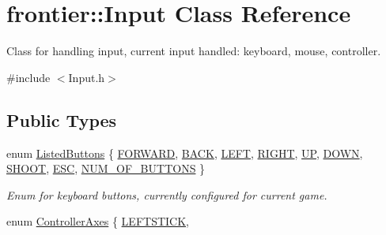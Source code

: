 \hypertarget{classfrontier_1_1_input}{}\section{frontier\+:\+:Input Class Reference}
\label{classfrontier_1_1_input}


Class for handling input, current input handled\+: keyboard, mouse, controller.  




{\ttfamily \#include $<$Input.\+h$>$}

\subsection*{Public Types}
\begin{DoxyCompactItemize}
\item 
enum \hyperlink{classfrontier_1_1_input_ada5b6b09af9c827bacee6fbc69015096}{Listed\+Buttons} \{ \newline
\hyperlink{classfrontier_1_1_input_ada5b6b09af9c827bacee6fbc69015096acf85ba7c8b56fe96ae704fcad0835413}{F\+O\+R\+W\+A\+RD}, 
\hyperlink{classfrontier_1_1_input_ada5b6b09af9c827bacee6fbc69015096a854a2566d855b54f71c31b1a80af7f7f}{B\+A\+CK}, 
\hyperlink{classfrontier_1_1_input_ada5b6b09af9c827bacee6fbc69015096a054bf540c4446c6dd0ebfbc47d3b86d6}{L\+E\+FT}, 
\hyperlink{classfrontier_1_1_input_ada5b6b09af9c827bacee6fbc69015096a3f8c1b55a3e0fa5b9e49e013af3aa898}{R\+I\+G\+HT}, 
\newline
\hyperlink{classfrontier_1_1_input_ada5b6b09af9c827bacee6fbc69015096ab29a79dea09fc2efd9195b5bd9f9cb59}{UP}, 
\hyperlink{classfrontier_1_1_input_ada5b6b09af9c827bacee6fbc69015096ae77fe1ca5149c538bcbe2d3220e065d5}{D\+O\+WN}, 
\hyperlink{classfrontier_1_1_input_ada5b6b09af9c827bacee6fbc69015096ac8790ceaafc8368972a3d7129c0d08e9}{S\+H\+O\+OT}, 
\hyperlink{classfrontier_1_1_input_ada5b6b09af9c827bacee6fbc69015096aa10db7305f9845cff63ba11af6092c0c}{E\+SC}, 
\newline
\hyperlink{classfrontier_1_1_input_ada5b6b09af9c827bacee6fbc69015096a0bf7f4342c9ece5810241620ccf09f45}{N\+U\+M\+\_\+\+O\+F\+\_\+\+B\+U\+T\+T\+O\+NS}
 \}\begin{DoxyCompactList}\small\item\em Enum for keyboard buttons, currently configured for current game. \end{DoxyCompactList}
\item 
enum \hyperlink{classfrontier_1_1_input_aa34e103eba0f13faf437863692310859}{Controller\+Axes} \{ \hyperlink{classfrontier_1_1_input_aa34e103eba0f13faf437863692310859a7d1d161914b2562dfd89a471e7b8e62c}{L\+E\+F\+T\+S\+T\+I\+CK}, 

\end{DoxyCompactItemize}
